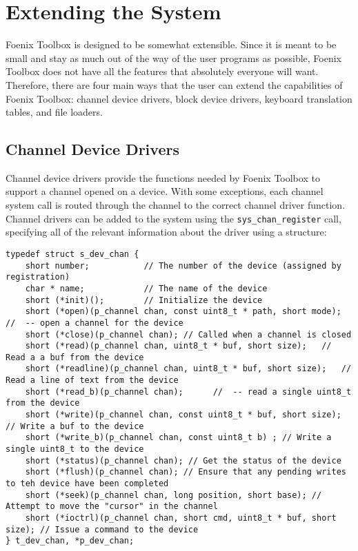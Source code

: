 \chapter{Extending the System}
Foenix Toolbox is designed to be somewhat extensible. Since it is meant to be small and stay as much out of the way of the user programs as possible,
Foenix Toolbox does not have all the features that absolutely everyone will want.
Therefore, there are four main ways that the user can extend the capabilities of Foenix Toolbox: channel device drivers, block device drivers,
keyboard translation tables, and file loaders.

\section{Channel Device Drivers}
Channel device drivers provide the functions needed by Foenix Toolbox to support a channel opened on a device. With some exceptions, each channel system call is routed through the channel to the correct channel driver function. Channel drivers can be added to the system using the \verb+sys_chan_register+ call, specifying all of the relevant information about the driver using a structure:

\begin{lstlisting}
typedef struct s_dev_chan {
    short number;           // The number of the device (assigned by registration)
    char * name;            // The name of the device
    short (*init)();        // Initialize the device
    short (*open)(p_channel chan, const uint8_t * path, short mode); //  -- open a channel for the device
    short (*close)(p_channel chan);	// Called when a channel is closed
    short (*read)(p_channel chan, uint8_t * buf, short size);	// Read a a buf from the device
    short (*readline)(p_channel chan, uint8_t * buf, short size);	// Read a line of text from the device
    short (*read_b)(p_channel chan);      //  -- read a single uint8_t from the device
    short (*write)(p_channel chan, const uint8_t * buf, short size);	// Write a buf to the device
    short (*write_b)(p_channel chan, const uint8_t b) ; // Write a single uint8_t to the device
    short (*status)(p_channel chan); // Get the status of the device
    short (*flush)(p_channel chan); // Ensure that any pending writes to teh device have been completed
    short (*seek)(p_channel chan, long position, short base); // Attempt to move the "cursor" in the channel
    short (*ioctrl)(p_channel chan, short cmd, uint8_t * buf, short size); // Issue a command to the device
} t_dev_chan, *p_dev_chan;
\end{lstlisting}

